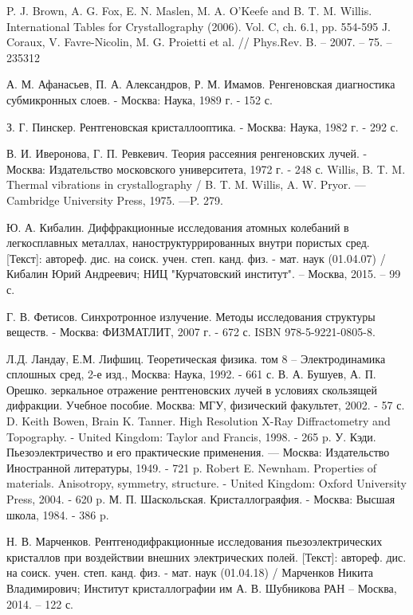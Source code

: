 \begin{thebibliography}{99}

  P. J. Brown, A. G. Fox, E. N. Maslen, M. A. O'Keefe and B. T. M. Willis.
  International Tables for Crystallography (2006). Vol. C, ch. 6.1, pp. 554-595
J. Coraux, V. Favre-Nicolin, M. G. Proietti et al. // Phys.Rev. B. – 2007. – 75. – 235312

  А. М. Афанасьев, П. А. Александров, Р. М. Имамов. Ренгеновская диагностика
  субмикронных слоев. - Москва: Наука, 1989 г. - 152 с.

  З. Г.  Пинскер. Рентгеновская кристаллооптика. - Москва: Наука, 1982 г. - 292 с.

    В. И.  Иверонова, Г. П. Ревкевич. Теория рассеяния ренгеновских лучей. -
    Москва: Издательство московского университета, 1972 г. - 248 с.
  Willis, B. T. M. Thermal vibrations in crystallography /
  B. T. M. Willis, A. W. Pryor. — Cambridge University Press, 1975. —P. 279.

  Ю. А. Кибалин. Диффракционные исследования атомных колебаний в легкосплавных
  металлах, наноструктуррированных внутри пористых сред. [Текст]: автореф. дис. на соиск.
   учен. степ. канд. физ. - мат. наук (01.04.07) /
   Кибалин Юрий Андреевич; НИЦ "Курчатовский институт". – Москва, 2015. – 99 с.

  Г. В. Фетисов. Синхротронное излучение. Методы исследования структуры веществ. -
  Москва: ФИЗМАТЛИТ, 2007 г. - 672 с. ISBN 978-5-9221-0805-8.

 Л.Д. Ландау, Е.М. Лифшиц. Теоретическая физика. том 8 –
 Электродинамика сплошных сред, 2-е изд., Москва: Наука, 1992. - 661 с.
 В. А. Бушуев, А. П. Орешко. зеркальное отражение рентгеновских лучей в условиях скользящей дифракции.
 Учебное пособие. Москва: МГУ, физический факультет, 2002. - 57 с.
 D. Keith Bowen, Brain K. Tanner. High Resolution X-Ray Diffractometry and Topography. - United Kingdom: Taylor and Francis, 1998. - 265 p.
 У. Кэди. Пьезоэлектричество и его практические применения. — Москва: Издательство Иностранной литературы, 1949. - 721 p.
  Robert E. Newnham. Properties of materials. Anisotropy, symmetry, structure. - United Kingdom: Oxford University Press, 2004. -  620 p.
  М. П. Шаскольская. Кристаллограяфия. - Москва: Высшая школа, 1984. - 386 p.

    Н. В. Марченков. Рентгенодифракционные исследования пьезоэлектрических кристаллов
    при воздействии внешних электрических полей. [Текст]: автореф. дис. на соиск.
     учен. степ. канд. физ. - мат. наук (01.04.18) /
     Марченков Никита Владимирович; Институт кристаллографии им А. В. Шубникова РАН  – Москва, 2014. – 122 с.
\end{thebibliography}
